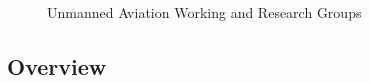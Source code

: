 \documentclass[usenames,dvipsnames,aspectratio=169,serif]{beamer}
\begin{document}
\begin{frame}
   \frametitle{}

   \begin{figure}[tbh]
      \begin{centering}
         \begin{center}
            \small\tt
            \hfil
         \hfil \end{center}
      \par\end{centering}
      \caption{Unmanned Aviation Working and Research Groups}
   \end{figure}

\end{frame}


\subsection{Overview}
\end{document}
